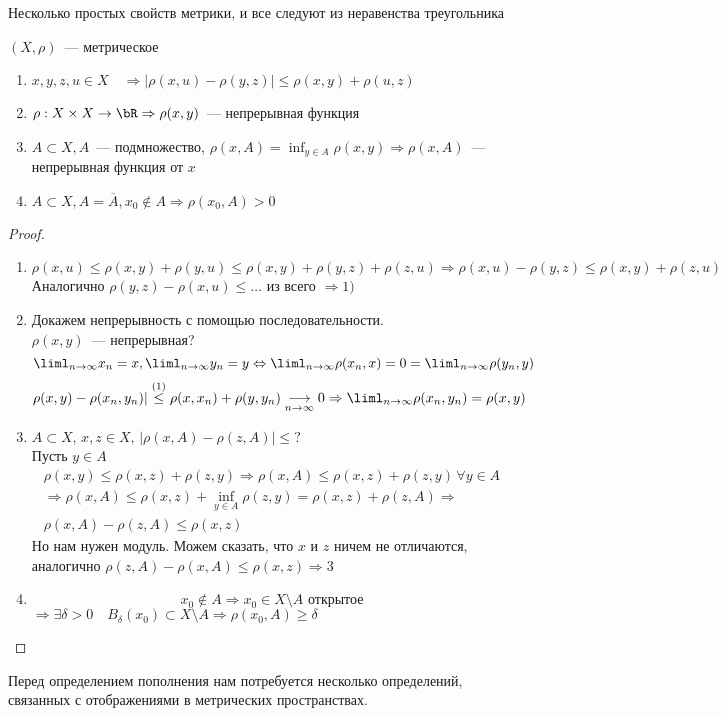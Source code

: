 \documentclass[document]{subfiles}
\begin{document}
Несколько простых свойств метрики, и все следуют из неравенства треугольника
\begin{theorem}
    \label{chap3:metric-props}
    $(X, \rho)$~--- метрическое
    \begin{enumerate}
        \item $x,y,z,u \in X \quad \Rightarrow |\rho(x, u) - \rho(y, z)| \leq \rho(x,y) + \rho(u,z)$
        \item $\rho: X \times X \rightarrow \bR \Rightarrow \rho(x,y)$~--- непрерывная функция
        \item $A \subset X, A $~--- подмножество, $\rho(x,A) = \inf_{y \in A} \rho(x,y) \Rightarrow \rho(x,A)$~--- непрерывная функция от $x$
        \item $A \subset X, A = \overline{A}, x_0 \notin A \Rightarrow \rho(x_0, A) > 0 $
    \end{enumerate}
    
\end{theorem}
\begin{proof}
    \begin{enumerate}
        \item $\rho(x,u) \leq \rho(x,y) + \rho(y,u) \leq \rho(x,y) + \rho(y,z) + \rho(z,u) \Rightarrow \rho(x,u) - \rho(y,z) \leq \rho(x,y) + \rho(z,u)$
        Аналогично $\rho(y,z) - \rho(x,u) \leq \ldots$
        из всего $\Rightarrow 1)$
        \item Докажем непрерывность с помощью последовательности. \\
         $\rho(x,y)$~--- непрерывная?
         \[ \liml_{n \to \infty} x_n = x, \liml_{n \to \infty} y_n = y \Leftrightarrow \liml_{n \to \infty} \rho(x_n, x) = 0 = \liml_{n \to \infty} \rho(y_n, y) \]
         $\rho(x,y) - \rho(x_n, y_n)| \stackrel{(1)}{\leq} \rho(x, x_n) + \rho(y, y_n) \underset{n \to \infty}{\longrightarrow} 0 \Rightarrow \liml_{n \to \infty} \rho(x_n, y_n) = \rho(x,y)$
         \item $A \subset X, \, x,z \in X, \, |\rho(x,A) - \rho(z,A)| \leq ? $ \\
         Пусть $y \in A$
         \begin{multline*}
            \rho(x,y) \leq \rho(x,z) + \rho(z,y) \Rightarrow \rho(x,A) \leq \rho(x,z) + \rho(z,y) \, \forall y \in A \\
            \Rightarrow \rho(x,A) \leq \rho(x,z) + \inf_{y \in A} \rho(z,y) = \rho(x,z) + \rho(z,A) \Rightarrow \\
            \rho(x,A) - \rho(z,A) \leq \rho(x,z)
         \end{multline*}
         Но нам нужен модуль. Можем сказать, что $x$ и $z$ ничем не отличаются, аналогично $\rho(z,A) - \rho(x,A) \leq \rho(x,z) \Rightarrow 3 $
         \item  \[ x_0 \notin A \Rightarrow x_0 \in X \setminus A \text{ открытое} \]
         $\Rightarrow \exists \delta > 0 \quad B_\delta(x_0) \subset X \setminus A \Rightarrow \rho(x_0, A) \geq \delta$
    \end{enumerate}

\end{proof}
Перед определением пополнения нам потребуется несколько определений, связанных с отображениями в метрических пространствах.
\end{document}

